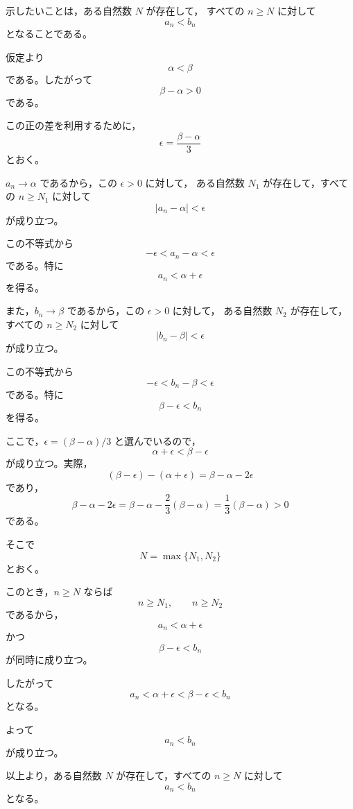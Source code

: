 \begin{strategy}
	示したいことは，ある自然数 $N$ が存在して，
	すべての $n\geq N$ に対して
	\[
	a_n<b_n
	\]
	となることである。
	
	仮定より
	\[
	\alpha<\beta
	\]
	である。したがって
	\[
	\beta-\alpha>0
	\]
	である。
	
	この正の差を利用するために，
	\[
	\epsilon=\frac{\beta-\alpha}{3}
	\]
	とおく。
	
	$a_n\to\alpha$ であるから，この $\epsilon>0$ に対して，
	ある自然数 $N_1$ が存在して，すべての $n\geq N_1$ に対して
	\[
	|a_n-\alpha|<\epsilon
	\]
	が成り立つ。
	
	この不等式から
	\[
	-\epsilon<a_n-\alpha<\epsilon
	\]
	である。特に
	\[
	a_n<\alpha+\epsilon
	\]
	を得る。
	
	また，$b_n\to\beta$ であるから，この $\epsilon>0$ に対して，
	ある自然数 $N_2$ が存在して，すべての $n\geq N_2$ に対して
	\[
	|b_n-\beta|<\epsilon
	\]
	が成り立つ。
	
	この不等式から
	\[
	-\epsilon<b_n-\beta<\epsilon
	\]
	である。特に
	\[
	\beta-\epsilon<b_n
	\]
	を得る。
	
	ここで，$\epsilon=(\beta-\alpha)/3$ と選んでいるので，
	\[
	\alpha+\epsilon<\beta-\epsilon
	\]
	が成り立つ。実際，
	\[
	(\beta-\epsilon)-(\alpha+\epsilon)
	=
	\beta-\alpha-2\epsilon
	\]
	であり，
	\[
	\beta-\alpha-2\epsilon
	=
	\beta-\alpha-\frac{2}{3}(\beta-\alpha)
	=
	\frac{1}{3}(\beta-\alpha)>0
	\]
	である。
	
	そこで
	\[
	N=\max\{N_1,N_2\}
	\]
	とおく。
	
	このとき，$n\geq N$ ならば
	\[
	n\geq N_1,
	\qquad
	n\geq N_2
	\]
	であるから，
	\[
	a_n<\alpha+\epsilon
	\]
	かつ
	\[
	\beta-\epsilon<b_n
	\]
	が同時に成り立つ。
	
	したがって
	\[
	a_n<\alpha+\epsilon<\beta-\epsilon<b_n
	\]
	となる。
	
	よって
	\[
	a_n<b_n
	\]
	が成り立つ。
	
	以上より，ある自然数 $N$ が存在して，すべての $n\geq N$ に対して
	\[
	a_n<b_n
	\]
	となる。
\end{strategy}
